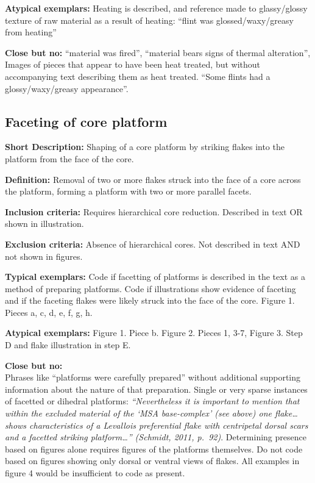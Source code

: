 \documentclass[
]{article}
\begin{document}
\textbf{Atypical exemplars:} Heating is described, and reference made to
glassy/glossy texture of raw material as a result of heating: ``flint
was glossed/waxy/greasy from heating''

\textbf{Close but no:} ``material was fired'', ``material bears signs of
thermal alteration'', Images of pieces that appear to have been heat
treated, but without accompanying text describing them as heat treated.
``Some flints had a glossy/waxy/greasy appearance''.

\hypertarget{faceting-of-core-platform}{%
\subsection{Faceting of core platform}\label{faceting-of-core-platform}}

\textbf{Short Description:} Shaping of a core platform by striking
flakes into the platform from the face of the core.

\textbf{Definition:} Removal of two or more flakes struck into the face
of a core across the platform, forming a platform with two or more
parallel facets.

\textbf{Inclusion criteria:} Requires hierarchical core reduction.
Described in text OR shown in illustration.

\textbf{Exclusion criteria:} Absence of hierarchical cores. Not
described in text AND not shown in figures.

\textbf{Typical exemplars:} Code if facetting of platforms is described
in the text as a method of preparing platforms. Code if illustrations
show evidence of faceting and if the faceting flakes were likely struck
into the face of the core. Figure 1. Pieces a, c, d, e, f, g, h.

\textbf{Atypical exemplars:} Figure 1. Piece b. Figure 2. Pieces 1, 3-7,
Figure 3. Step D and flake illustration in step E.

\textbf{Close but no:}\\
Phrases like ``platforms were carefully prepared'' without additional
supporting information about the nature of that preparation. Single or
very sparse instances of facetted or dihedral platforms:
\emph{``Nevertheless it is important to mention that within the excluded
material of the `MSA base-complex' (see above) one flake\ldots{} shows
characteristics of a Levallois preferential flake with centripetal
dorsal scars and a facetted striking platform\ldots{}'' (Schmidt, 2011,
p.~92)}. Determining presence based on figures alone requires figures of
the platforms themselves. Do not code based on figures showing only
dorsal or ventral views of flakes. All examples in figure 4 would be
insufficient to code as present.
\end{document}
